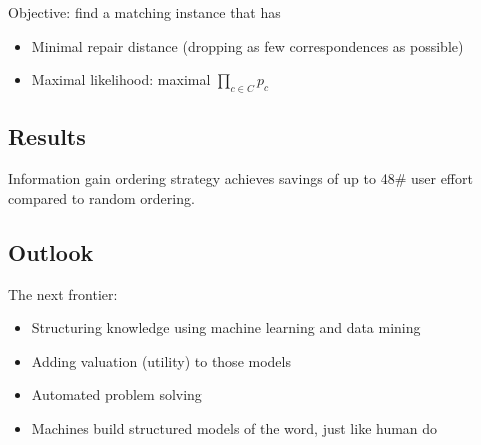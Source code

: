 Objective: find a matching instance that has
\begin{itemize}
\item Minimal repair distance (dropping as few correspondences as
  possible)
\item Maximal likelihood: maximal $ \prod_{c \in C} p_c $
\end{itemize}

\subsection{Results}
Information gain ordering strategy achieves savings of up to 48\# user
effort compared to random ordering.

\subsection{Outlook}
The next frontier:
\begin{itemize}
\item Structuring knowledge using machine learning and data mining
\item Adding valuation (utility) to those models
\item Automated problem solving
\item Machines build structured models of the word, just like human do
\end{itemize}

